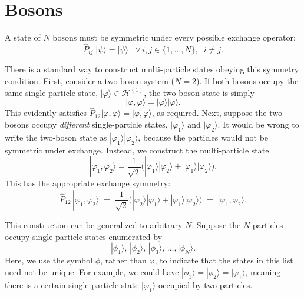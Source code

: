 \documentclass[pra,12pt]{revtex4}
\begin{document}
\section{Bosons}

A state of $N$ bosons must be symmetric under every possible exchange
operator:
\begin{equation}
  \hat{P}_{ij}\; |\psi\rangle = |\psi\rangle \;\;\; \forall\, i, j \in\{1,\dots,N\},\;\; i\ne j.
\end{equation}

There is a standard way to construct multi-particle states obeying
this symmetry condition.  First, consider a two-boson system ($N =
2$).  If both bosons occupy the same single-particle state,
$|\varphi\rangle \in \mathscr{H}^{(1)}$, the two-boson state is simply
\begin{equation}
  |\varphi,\varphi\rangle = |\varphi\rangle  |\varphi\rangle.
\end{equation}
This evidently satisfies $\hat{P}_{12} |\varphi,\varphi\rangle =
|\varphi,\varphi\rangle$, as required.  Next, suppose the two bosons
occupy \textit{different} single-particle states, $|\varphi_1\rangle$
and $|\varphi_2\rangle$.  It would be wrong to write the two-boson
state as $|\varphi_1\rangle |\varphi_2\rangle$, because the particles
would not be symmetric under exchange.  Instead, we construct the
multi-particle state
\begin{equation}
  |\varphi_1,\varphi_2\rangle = \frac{1}{\sqrt{2}} \Big( |\varphi_1\rangle  |\varphi_2\rangle + |\varphi_1\rangle  |\varphi_2\rangle\Big).
\end{equation}
This has the appropriate exchange symmetry:
\begin{equation}
  \hat{P}_{12}\,|\varphi_1,\varphi_2\rangle \;=\; \frac{1}{\sqrt{2}} \Big( |\varphi_2\rangle  |\varphi_1\rangle + |\varphi_1\rangle  |\varphi_2\rangle\Big) \;=\; |\varphi_1,\varphi_2\rangle.
\end{equation}

This construction can be generalized to arbitrary $N$.  Suppose the
$N$ particles occupy single-particle states enumerated by
\begin{equation}
  |\phi_1\rangle, \, |\phi_2\rangle, \, |\phi_3\rangle, \, \dots, |\phi_N\rangle.
\end{equation}
Here, we use the symbol $\phi$, rather than $\varphi$, to indicate
that the states in this list need not be unique.  For example, we
could have $|\phi_1\rangle = |\phi_2\rangle = |\varphi_1\rangle$,
meaning there is a certain single-particle state $|\varphi_1\rangle$
occupied by two particles.
\end{document}
